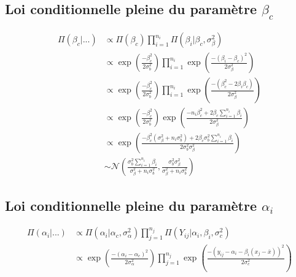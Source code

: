 \documentclass[
]{article}
\begin{document}
\hypertarget{loi-conditionnelle-pleine-du-paramuxe8tre-beta_c}{%
\subsection{\texorpdfstring{Loi conditionnelle pleine du paramètre
\(\beta_c\)}{Loi conditionnelle pleine du paramètre \textbackslash beta\_c}}\label{loi-conditionnelle-pleine-du-paramuxe8tre-beta_c}}

\begin{align*}
\Pi(\beta_{c}|...) &\propto \Pi(\beta_{c}) \prod_{i=1}^{n_{i}} \Pi(\beta_{i}|\beta_{c},\sigma_{\beta}^{2} ) \\
        &\propto \exp\left(\frac{-\beta_{c}^{2}}{2\sigma_{b}^{2}}\right)\prod_{i=1}^{n_{i}} \exp\left(\frac{-(\beta_{i}-\beta_{c})^{2}}{2\sigma_{\beta}^{2}}\right) \\
        &\propto \exp\left(\frac{-\beta_{c}^{2}}{2\sigma_{b}^{2}}\right)\prod_{i=1}^{n_{i}} \exp\left(\frac{-(\beta_{c}^{2}-2\beta_{i}\beta_{c})}{2\sigma_{\beta}^{2}}\right) \\
        &\propto \exp\left(\frac{-\beta_{c}^{2}}{2\sigma_{b}^{2}}\right) \exp\left(\frac{-n_i\beta_{c}^{2}+2\beta_{c}\sum\limits_{i=1}^{n_{i}} \beta_{i}}{2\sigma_{\beta}^{2}}\right)\\
        &\propto \exp\left(\frac{-\beta_{c}^{2}(\sigma_{\beta}^{2}+n_i\sigma_{b}^{2}) +2\beta_{c}\sigma_{b}^{2}\sum\limits_{i=1}^{n_{i}} \beta_{i}}{2\sigma_{b}^{2}\sigma_{\beta}^{2}}\right)\\
        &\sim \mathcal{N}\left(\frac{\sigma_{b}^{2}\sum\limits_{i=1}^{n_{i}} \beta_{i}}{\sigma_{\beta}^{2}+n_{i}\sigma_{b}^{2}},\frac{\sigma_{b}^{2}\sigma_{\beta}^{2}}{\sigma_{\beta}^{2}+n_{i}\sigma_{b}^{2}}\right)
\end{align*}

\hypertarget{loi-conditionnelle-pleine-du-paramuxe8tre-alpha_i}{%
\subsection{\texorpdfstring{Loi conditionnelle pleine du paramètre
\(\alpha_i\)}{Loi conditionnelle pleine du paramètre \textbackslash alpha\_i}}\label{loi-conditionnelle-pleine-du-paramuxe8tre-alpha_i}}

\begin{align*}
\Pi(\alpha_{i}|...) &\propto \Pi(\alpha_{i}|\alpha_{c},\sigma_{\alpha}^{2} ) \prod_{j=1}^{n_{j}} \Pi(Y_{ij}|\alpha_{i},\beta_{i},\sigma_{c}^{2} ) \\
        &\propto \exp\left(\frac{-(\alpha_{i}-\alpha_{c})^{2}}{2\sigma_{\alpha}^{2}}\right) \prod_{j=1}^{n_{j}} \exp\left(\frac{-(y_{ij}-\alpha_{i}-\beta_i(x_{j}-\bar{x}))^{2}}{2\sigma_{c}^{2}}\right) 
\end{align*}
\end{document}
